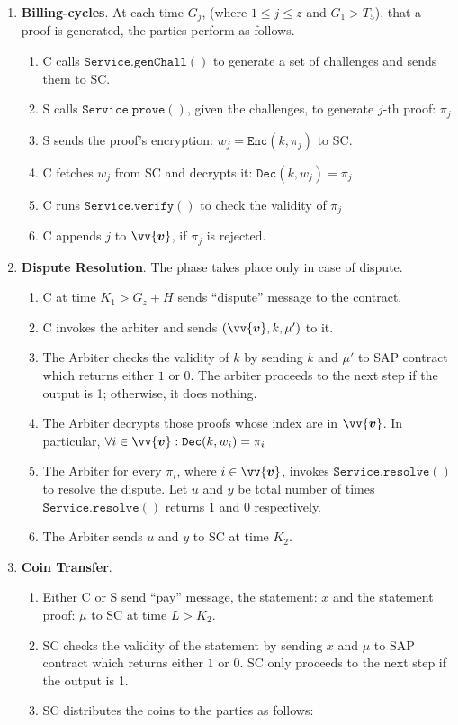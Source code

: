 \begin{enumerate}
\begin{enumerate}
\end{enumerate}
\item \textbf{Billing-cycles}. At each time $G_{j}$, (where $1\leq j\leq z$ and $G_1>T_{5}$), that a proof is generated, the parties perform as follows. 
\begin{enumerate}
\item C calls $\mathtt{Service.genChall()}$ to generate a set of challenges and sends them to SC. 
\item S calls $\mathtt{Service.prove()}$, given the challenges, to generate $j$-th proof: $\pi_{j}$ 
\item S sends the proof's encryption: $w_j=\mathtt{Enc}(k,\pi_{j})$ to SC. 
\item C fetches $w_j$ from SC and decrypts it: $\mathtt{Dec}(k,w_j)=\pi_{j}$
\item C runs $\mathtt{Service.verify()}$ to check the validity of $\pi_{j}$ 
\item C appends $j$  to $\vv{\bm{v}}$, if $\pi_{j}$ is rejected.

\end{enumerate}
\item \textbf{Dispute Resolution}. The phase takes place only in  case of dispute. 
\begin{enumerate}
\item C at time $K_1>G_z+H$ sends ``dispute'' message to the contract. 
\item C  invokes the arbiter and sends $(\vv{\bm{v}},k,\mu')$ to it. 

\item The Arbiter checks the validity of $k$ by sending $k$ and $\mu'$ to SAP contract which  returns  either $1$ or $0$. The arbiter proceeds to the next step if the output is 1; otherwise, it does nothing. 
\item The Arbiter decrypts those proofs whose index are in $\vv{\bm{v}}$. In particular,  $\forall i\in \vv{\bm{v}}: \mathtt{Dec}(k,w_i)=\pi_i$
\item The Arbiter for every $\pi_i$, where $i\in\vv{\bm{v}}$,   invokes $\mathtt{Service.resolve()}$ to resolve the dispute. Let $u$ and $y$  be total number of times $\mathtt{Service.resolve()}$ returns $1$ and $0$ respectively.  
\item The Arbiter sends $u$ and $y$ to SC at time $K_{2}$. 
\end{enumerate}
\item \textbf{Coin Transfer}.
\begin{enumerate}
\item Either C or S send ``pay'' message,  the statement: $x$ and the statement proof: $\mu$ to SC at time $L>K_2$.
\item SC checks the validity of the statement by sending $x$ and $\mu$ to SAP contract which  returns  either $1$ or $0$. SC only proceeds to the next step if the output is 1. 
\item SC distributes the coins to the parties as follows:


\end{enumerate}
\end{enumerate}
